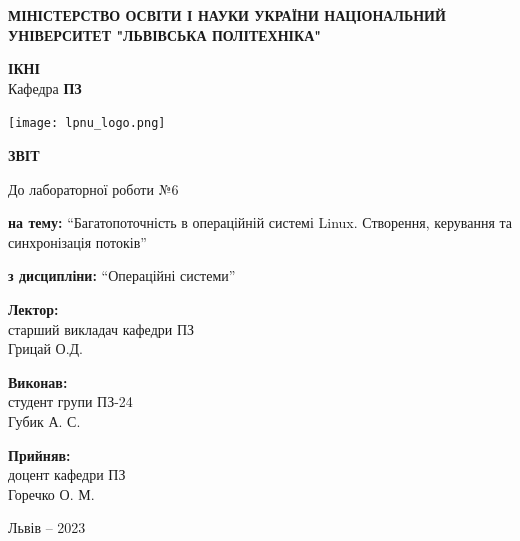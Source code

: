 \documentclass[12pt]{extarticle}
\begin{document}
\begin{titlepage}
    \begin{center}
        \textbf{\normalsize{\MakeUppercase{
            Міністерство Освіти і науки України
            Національний університет "Львівська політехніка"
        }}}

        \begin{flushright}
        \textbf{ІКНІ}\\
        Кафедра \textbf{ПЗ}
        \end{flushright}
        \vspace{15mm}

        \texttt{[image: lpnu\_logo.png]}

        \vspace*{\fill}

        \textbf{\normalsize{\MakeUppercase{Звіт}}}
            
        До лабораторної роботи №6

        \textbf{на тему:} “Багатопоточність в операційній системі Linux. Створення,
        керування та синхронізація потоків”

        \textbf{з дисципліни:} “Операційні системи”
            
        \vspace*{\fill}

        \begin{flushright}

            \textbf{Лектор:}\\
            старший викладач кафедри ПЗ\\
            Грицай О.Д.\\
            \vspace{12pt}

            \textbf{Виконав:}\\
            студент групи ПЗ-24\\
            Губик А. С.\\
            \vspace{12pt}

            \textbf{Прийняв:}\\
            доцент кафедри ПЗ\\
            Горечко О. М.\\
        \vspace{12pt}
        \end{flushright}

        Львів -- 2023
            
            
    \end{center}
\end{titlepage}
\end{document}
